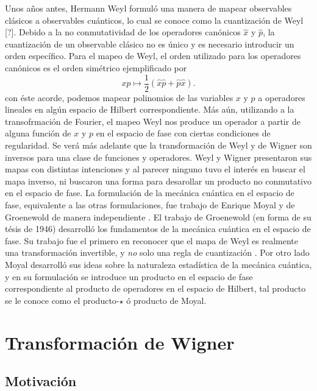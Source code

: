 \documentclass[a4paper]{report}
\begin{document}
  Unos años antes, Hermann Weyl formuló una manera de mapear
  observables clásicos a observables cuánticos, lo cual se
  conoce como la cuantización de Weyl [?]. Debido a la no
  conmutatividad de los operadores canónicos $\hat{x}$ y
  $\hat{p}$, la cuantización de un observable clásico no es
  único y es necesario introducir un orden específico. Para
  el mapeo de Weyl, el orden utilizado para los operadores
  canónicos es el orden simétrico ejemplificado por
  \[
    xp \mapsto
    \frac{1}{2}\left( \hat{x} \hat{p} + \hat{p} \hat{x}
    \right).
  \]
  con éste acorde, podemos mapear polinomios de las
  variables $x$ y $p$ a operadores lineales en algún espacio
  de Hilbert correspondiente. Más aún, utilizando a la
  transofrmación de Fourier, el mapeo Weyl nos produce un
  operador a partir de alguna función de $x$ y $p$ en el
  espacio de fase con ciertas condiciones de regularidad. Se
  verá más adelante que la transformación de Weyl y de
  Wigner son inversos para una clase de funciones y
  operadores.  Weyl y Wigner presentaron sus mapas con
  distintas intenciones y al parecer ninguno tuvo el interés
  en buscar el mapa inverso, ni buscaron una forma para
  desarollar un producto no conmutativo en el espacio de
  fase. La formulación de la mecánica cuántica en el espacio
  de fase, equivalente a las otras formulaciones, fue
  trabajo de Enrique Moyal y de Groenewold de manera
  independiente \cite{curtrightQuantumMechanicsPhase2012}.
  El trabajo de Groenewold (en forma de su tésis de 1946)
  desarrolló los fundamentos de la mecánica cuántica en el
  espacio de fase. Su trabajo fue el primero en reconocer
  que el mapa de Weyl es realmente una transformación
  invertible, y \textit{no} solo una regla de cuantización
  \cite{todorovQuantizationMystery2012}. Por otro lado Moyal
  desarrolló sus ideas sobre la naturaleza estadística de la
  mecánica cuántica, y en su formulación se introduce un
  producto en el espacio de fase correspondiente al producto
  de operadores en el espacio de Hilbert, tal producto se le
  conoce como el producto-$\star$ ó producto de Moyal.

  

  \section{Transformación de Wigner}

  \subsection{Motivación}
\end{document}
